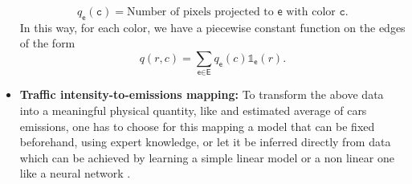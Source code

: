 \documentclass[11pt,a4paper,twoside]{article}
\newcommand{\asmodif}[2]{{\color{teal} #1} {\sout{#2}}}
\theoremstyle{definition}
\numberwithin{equation}{section}
\newcommand{\E}{\ensuremath{\textsf{E}}} %
\newcommand{\ee}{\ensuremath{\textsf{e}}}
\newcommand{\<}{\langle}
\renewcommand{\>}{\rangle}
\newcommand{\om}[1]{\textcolor{blue}{#1}}
\begin{document}
\begin{itemize}
{      $$
      q_\ee(\texttt{c}) = \text{Number of pixels projected to $\ee$ with color $\texttt{c}$}.
      $$
      }{}
      In this way, for each color, we have a piecewise constant function on the edges of the form
      \begin{equation}
      q(r,c)=\sum_{\ee\in \E} q_\ee(c) \mathds{1}_\ee(r).
      \label{eq:q}
      \end{equation}
      \item \textbf{Traffic intensity-to-emissions mapping:} \asmodif{To transform the above data into a meaningful physical quantity, like and estimated average of cars emissions, one has to choose for this mapping a model that can be fixed beforehand, using expert knowledge, or let it be inferred directly from data which can be achieved by learning a simple linear model or a non linear one like a neural network}{}.
      
      
\end{itemize}
\end{document}
